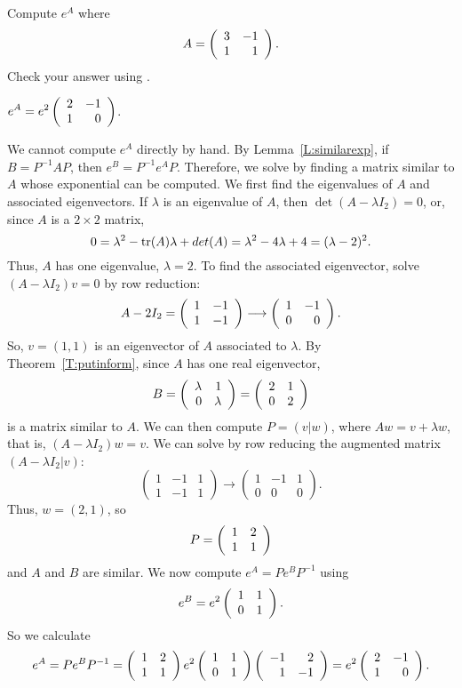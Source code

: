\documentclass{ximera}
\begin{document}
\begin{exercise} \label{c6.5.6}
Compute $e^A$ where
\[
A = \left(\begin{array}{rr} 3 & -1\\ 1 &1\end{array}\right).
\]
Check your answer using \Matlabp.

\begin{solution}

\ans $\displaystyle e^A = e^2\left(\begin{array}{rr} 2 & -1\\ 1 &0\end{array}\right)$.

\soln We cannot compute $e^A$ directly by hand.  By Lemma~\ref{L:similarexp},
if $B = P^{-1}AP$, then $e^B = P^{-1}e^AP$.  Therefore, we solve by
finding a matrix similar to $A$ whose exponential can be computed.  
We first find the eigenvalues of $A$ and associated eigenvectors.
If $\lambda$ is an eigenvalue of $A$, then $\det(A - \lambda I_2) =
0$, or, since $A$ is a $2 \times 2$ matrix,
\[ 0 = \lambda^2 - {\rm tr}(A)\lambda + det(A) = \lambda^2 - 4\lambda +
4 = (\lambda - 2)^2. \]
Thus, $A$ has one eigenvalue, $\lambda = 2$.  To find the associated
eigenvector, solve $(A - \lambda I_2)v = 0$ by row reduction:
\[ A - 2I_2 = \left(\begin{array}{rr} 1 & -1\\ 1 &-1\end{array}\right) \longrightarrow
\left(\begin{array}{rr} 1 & -1\\ 0 &0\end{array}\right). \]
So, $v = (1,1)$ is an eigenvector of $A$ associated to $\lambda$.
By Theorem~\ref{T:putinform}, since $A$
has one real eigenvector, 
\[ B = \left(\begin{array}{rr} \lambda & 1\\ 0 &\lambda\end{array}\right) = \left(\begin{array}{rr} 2 & 1\\ 0 &2\end{array}\right) \]
is a matrix similar to $A$.  We can then compute $P = (v|w)$, where
$Aw = v + \lambda w$, that is, $(A - \lambda I_2)w = v$.  We can solve
by row reducing the augmented matrix $(A - \lambda I_2|v)$:
\[ \left(\begin{array}{rr|r} 1 & -1 & 1 \\ 1 & -1 & 1 \end{array}
\right) \longrightarrow \left(\begin{array}{rr|r} 1 & -1 & 1 \\
0 & 0 & 0 \end{array}\right). \]
Thus, $w = (2,1)$, so
\[ P = \left(\begin{array}{rr} 1 & 2\\ 1 &1\end{array}\right) \]
and $A$ and $B$ are similar.
We now compute $e^A = Pe^BP^{-1}$ using 
\[ 
e^B = e^2\left(\begin{array}{rr} 1 & 1\\ 0 &1\end{array}\right). 
\]
So we calculate 
\[ 
e^A = Pe^BP^{-1} = \left(\begin{array}{rr} 1 & 2\\ 1 &1\end{array}\right)e^2\left(\begin{array}{rr} 1 & 1\\ 0 &1\end{array}\right)
\left(\begin{array}{rr} -1 & 2\\ 1 &-1\end{array}\right) = e^2\left(\begin{array}{rr} 2 & -1\\ 1 &0\end{array}\right). 
\]



\end{solution}
\end{exercise}
\end{document}
